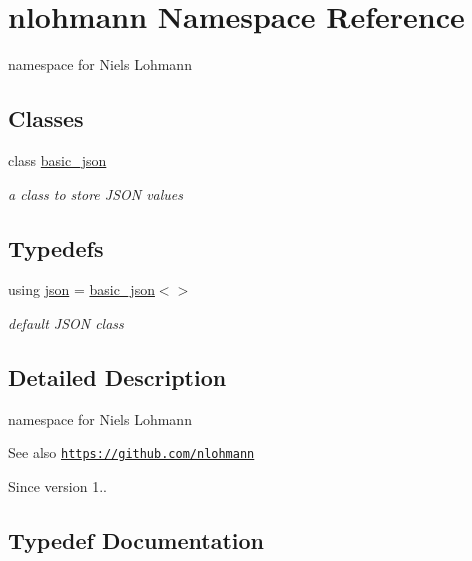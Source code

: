\hypertarget{a00434}{}\section{nlohmann Namespace Reference}
\label{a00434}


namespace for Niels Lohmann  


\subsection*{Classes}
\begin{DoxyCompactItemize}
\item 
class \hyperlink{a00025}{basic\+\_\+json}
\begin{DoxyCompactList}\small\item\em a class to store J\+S\+ON values \end{DoxyCompactList}\end{DoxyCompactItemize}
\subsection*{Typedefs}
\begin{DoxyCompactItemize}
\item 
using \hyperlink{a00434_a2bfd99e845a2e5cd90aeaf1b1431f474}{json} = \hyperlink{a00025}{basic\+\_\+json}$<$$>$
\begin{DoxyCompactList}\small\item\em default J\+S\+ON class \end{DoxyCompactList}\end{DoxyCompactItemize}


\subsection{Detailed Description}
namespace for Niels Lohmann 

\begin{DoxySeeAlso}{See also}
\href{https://github.com/nlohmann}{\tt https\+://github.\+com/nlohmann} 
\end{DoxySeeAlso}
\begin{DoxySince}{Since}
version 1.. 
\end{DoxySince}


\subsection{Typedef Documentation}
